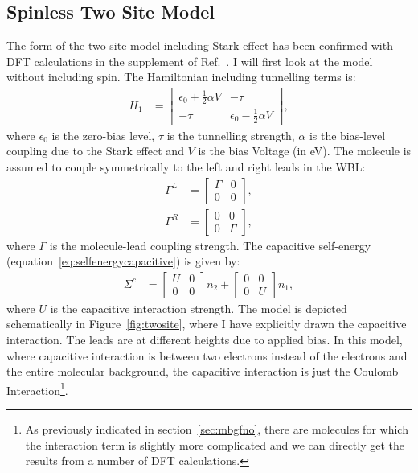 \subsection{Spinless Two Site Model}
The form of the two-site model including Stark effect has been confirmed with DFT calculations in the supplement of Ref.~\cite{perrinnano}. I  will first look at the model without including spin. The Hamiltonian including tunnelling terms is:
\begin{align}
H_1 &= \begin{bmatrix} \epsilon_0 + \frac{1}{2} \alpha V & -\tau \\
-\tau & \epsilon_0 - \frac{1}{2} \alpha V\end{bmatrix},
\label{eq:spinlesshamiltonian}
\end{align}
where $\epsilon_0$ is the zero-bias level, $\tau$ is the tunnelling strength, $\alpha$ is the bias-level coupling due to the Stark effect and $V$ is the bias Voltage (in eV). The molecule is assumed to couple symmetrically to the left and right leads in the WBL:
\begin{align*}
\Gamma^L &= \begin{bmatrix} \Gamma & 0 \\ 0 & 0 \end{bmatrix},\\ \Gamma^R &= \begin{bmatrix} 0 & 0 \\ 0 & \Gamma \end{bmatrix},
\end{align*}
where $\Gamma$ is the molecule-lead coupling strength. The capacitive self-energy (equation~\ref{eq:selfenergycapacitive}) is given by:
\begin{align*}
\Sigma^c &= \begin{bmatrix} U & 0 \\ 0 & 0 \end{bmatrix} n_2 + \begin{bmatrix} 0 & 0 \\ 0 & U \end{bmatrix} n_1,
\end{align*}
where $U$ is the capacitive interaction strength.  The model is depicted schematically in Figure~\ref{fig:twosite}, where I have explicitly drawn the capacitive interaction. The leads are at different heights due to applied bias. In this model, where capacitive interaction is between two electrons instead of the electrons and the entire molecular background, the capacitive interaction is just the Coulomb Interaction\footnote{As previously indicated in section~\ref{sec:mbgfno}, there are molecules for which the interaction term is slightly more complicated and we can directly get the results from a number of DFT calculations.}.


